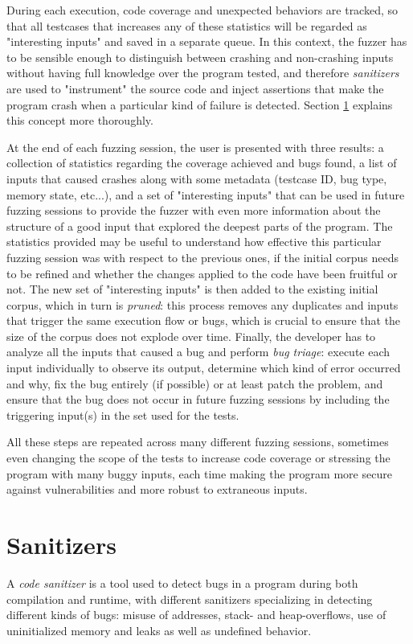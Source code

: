 During each execution, code coverage and unexpected behaviors are tracked, so that all testcases that increases any of these statistics will be regarded as "interesting inputs" and saved in a separate queue. In this context, the fuzzer has to be sensible enough to distinguish between crashing and non-crashing inputs without having full knowledge over the program tested, and therefore \textit{sanitizers} are used to "instrument" the source code and inject assertions that make the program crash when a particular kind of failure is detected. Section \ref{sanitizers} explains this concept more thoroughly.

At the end of each fuzzing session, the user is presented with three results: a collection of statistics regarding the coverage achieved and bugs found, a list of inputs that caused crashes along with some metadata (testcase ID, bug type, memory state, etc...), and a set of "interesting inputs" that can be used in future fuzzing sessions to provide the fuzzer with even more information about the structure of a good input that explored the deepest parts of the program. 
The statistics provided may be useful to understand how effective this particular fuzzing session was with respect to the previous ones, if the initial corpus needs to be refined and whether the changes applied to the code have been fruitful or not.
The new set of "interesting inputs" is then added to the existing initial corpus, which in turn is \textit{pruned}: this process removes any duplicates and inputs that trigger the same execution flow or bugs, which is crucial to ensure that the size of the corpus does not explode over time.
Finally, the developer has to analyze all the inputs that caused a bug and perform \textit{bug triage}: execute each input individually to observe its output, determine which kind of error occurred and why, fix the bug entirely (if possible) or at least patch the problem, and ensure that the bug does not occur in future fuzzing sessions by including the triggering input(s) in the set used for the tests.

All these steps are repeated across many different fuzzing sessions, sometimes even changing the scope of the tests to increase code coverage or stressing the program with many buggy inputs, each time making the program more secure against vulnerabilities and more robust to extraneous inputs. 




\newpage
\section{Sanitizers} \label{sanitizers}
A \textit{code sanitizer} is a tool used to detect bugs in a program during both compilation and runtime, with different sanitizers specializing in detecting different kinds of bugs: misuse of addresses, stack- and heap-overflows, use of uninitialized memory and leaks as well as undefined behavior.

